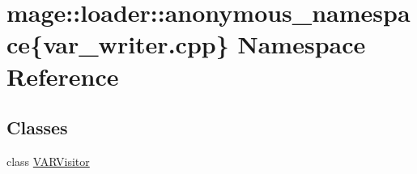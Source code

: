 \hypertarget{namespacemage_1_1loader_1_1anonymous__namespace_02var__writer_8cpp_03}{}\section{mage\+:\+:loader\+:\+:anonymous\+\_\+namespace\{var\+\_\+writer.\+cpp\} Namespace Reference}
\label{namespacemage_1_1loader_1_1anonymous__namespace_02var__writer_8cpp_03}
\subsection*{Classes}
\begin{DoxyCompactItemize}
\item 
class \mbox{\hyperlink{classmage_1_1loader_1_1anonymous__namespace_02var__writer_8cpp_03_1_1_v_a_r_visitor}{V\+A\+R\+Visitor}}
\end{DoxyCompactItemize}
